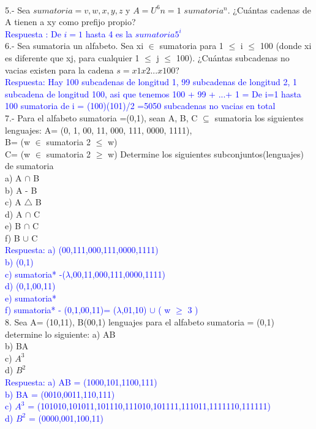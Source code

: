 \documentclass{article}
\begin{document}
\\
5.- Sea $sumatoria= {v, w, x, y, z}$ y $A= U^6 n=1$ $sumatoria ^n$. ¿Cuántas cadenas de A tienen a xy como prefijo propio? \\
\textcolor{blue}{Respuesta :  De $i=1$ hasta 4 es la $sumatoria 5^i$
}
\\
6.- Sea  sumatoria un alfabeto. Sea xi $\in$ sumatoria para  1 $\leq$ i $\leq$ 100 (donde xi es diferente que xj, para cualquier  1 $\leq$ j $\leq$ 100). ¿Cuántas subcadenas no vacias existen para la cadena $s= x1x2...x100$?  \\
\textcolor{blue}{Respuesta: Hay 100 subcadenas de longitud 1, 99 subcadenas de longitud 2, 1 subcadena de longitud 100, asi que tenemos 100 + 99 + ...+ 1 = De i=1 hasta 100 sumatoria de i = (100)(101)/2 =5050 subcadenas no vacias en total }
\\
7.- Para el alfabeto sumatoria =(0,1), sean A, B, C $\subseteq$ sumatoria los siguientes lenguajes:
A= (0, 1, 00, 11, 000, 111, 0000, 1111),\\
B= (w $\in$ sumatoria 2 $\leq$ w)\\
C= (w $\in$ sumatoria 2 $\geq$ w)
Determine los siguientes subconjuntos(lenguajes) de sumatoria\\
a) A $\cap$ B\\
b) A - B \\
c) A $\bigtriangleup$ B\\
d) A $\cap$ C \\ 
e) B $\cap$ C \\
f) B $\cup$ C 
\\
\textcolor{blue}{Respuesta: 
a) (00,111,000,111,0000,1111)\\
b) (0,1) \\
c) sumatoria* -($\lambda$,00,11,000,111,0000,1111)\\
d) (0,1,00,11) \\ 
e) sumatoria* \\
f) sumatoria* - (0,1,00,11)= ($\lambda$,01,10) $\cup$ ( w $\geq$ 3 )
}
\\
8. Sea A= (10,11), B(00,1) lenguajes para el alfabeto sumatoria = (0,1) determine lo siguiente:
a) AB\\
b) BA \\
c) $A^3$\\
d) $B^2$ \\ 
\textcolor{blue}{Respuesta:
a) AB = (1000,101,1100,111)\\
b) BA = (0010,0011,110,111) \\
c) $A^3$ = (101010,101011,101110,111010,101111,111011,1111110,111111)\\
d) $B^2$ = (0000,001,100,11)
}
\end{document}
